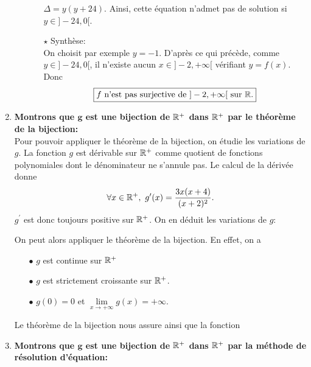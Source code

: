 \documentclass[a4paper, 11pt,reqno]{article}
\begin{document}
\begin{correction}
\begin{enumerate}
\begin{itemize}
\begin{itemize}
					      $\Delta=y(y+24).$
					      Ainsi, cette \'equation n'admet pas de solution si $y\in\rbrack -24,0\lbrack$.
					      \item[$\star$]  Synth\`ese:\\
						      \noindent On choisit par exemple $y=-1$. D'apr\`es ce qui pr\'ec\`ede, comme $y\in\rbrack -24,0\lbrack$, il n'existe aucun $x\in\rbrack -2,+\infty\lbrack$ v\'erifiant $y=f(x)$. Donc
						      $$\fbox{$ f\ \hbox{n'est pas surjective de}\ \rbrack -2,+\infty\lbrack\ \hbox{sur}\ \mathbb{R}. $}$$
				      \end{itemize}
		      \end{itemize}
		\item  \textbf{Montrons que $\mathbf{g}$ est une bijection de $\mathbf{\mathbb{R}^+}$ dans $\mathbf{\mathbb{R}^+}$ par le th\'eor\`{e}me de la bijection:}\\
		      \noindent Pour pouvoir appliquer le th\'eor\`eme de la bijection, on \'etudie les variations de $g$. La fonction $g$ est d\'erivable sur $\mathbb{R}^+$ comme quotient de fonctions polynomiales dont le d\'enominateur ne s'annule pas.
		      \noindent Le calcul de la d\'eriv\'ee donne
		      $$\forall x\in\mathbb{R}^+,\ g^{\prime}(x)=\displaystyle\frac{3x(x+4)}{(x+2)^2}.$$
		      $g^{\prime}$ est donc toujours positive sur $\mathbb{R}^+$.
		      On en d\'eduit les variations de $g$:
		      \begin{center}
		      \end{center}
		      On peut alors appliquer le th\'eor\`eme de la bijection. En effet, on a
		      \begin{itemize}
			      \item[$\bullet$] $g$ est continue sur $\mathbb{R}^+$
			      \item[$\bullet$]  $g$ est strictement croissante sur $\mathbb{R}^+$.
			      \item[$\bullet$] $g(0)=0$ et $\lim\limits_{x\to +\infty} g(x)=+\infty$.
		      \end{itemize}
		      Le th\'eor\`eme de la bijection nous assure ainsi que la fonction 
		\item  \textbf{Montrons que $\mathbf{g}$ est une bijection de $\mathbf{\mathbb{R}^+}$ dans $\mathbf{\mathbb{R}^+}$ par la m\'ethode de r\'esolution d'\'equation:}

\end{enumerate}
\end{correction}
\end{document}
